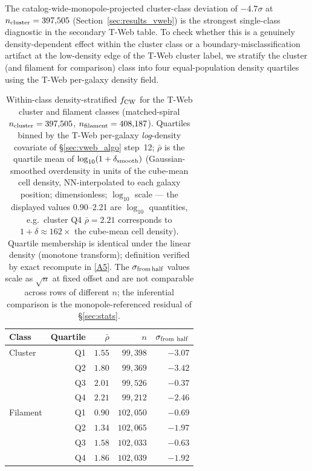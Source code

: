 \documentclass[twocolumn,linenumbers]{aastex702}
\newcommand{\repoBase}{https://github.com/Hubify-Projects/bigbounce/blob/main}
\begin{document}
The catalog-wide-monopole-projected cluster-class deviation of $-4.7\sigma$ at
$n_{\rm cluster} = 397{,}505$ (Section~\ref{sec:results_vweb}) is the
strongest single-class diagnostic in the secondary T-Web table. To check whether
this is a genuinely density-dependent effect within the cluster class
or a boundary-misclassification artifact at the low-density edge of
the T-Web cluster label, we stratify the cluster (and filament for
comparison) class into four equal-population density quartiles using
the T-Web per-galaxy density field.

\begin{table}[ht]
\caption{Within-class density-stratified $f_{\rm CW}$ for the T-Web
cluster and filament classes (matched-spiral $n_{\rm cluster} =
397{,}505$, $n_{\rm filament} = 408{,}187$). Quartiles binned by the
T-Web per-galaxy \emph{log}-density covariate of \S\ref{sec:vweb_algo}
step~12; $\bar\rho$ is the quartile mean of
$\log_{10}(1 + \delta_{\rm smooth})$ (Gaussian-smoothed overdensity
in units of the cube-mean cell density, NN-interpolated to each
galaxy position; dimensionless; $\log_{10}$ scale --- the displayed
values 0.90--2.21 are $\log_{10}$ quantities, e.g.\ cluster
Q4 $\bar\rho=2.21$ corresponds to $1\!+\!\delta\approx\!162\times$
the cube-mean cell density). Quartile membership is identical under
the linear density (monotone transform); definition verified by exact
recompute in
\href{\repoBase/pipelines/p5\_desi\_chirality/outputs/21\_r23conf\_meta\_closures.json}{[A5]}.
The $\sigma_{\rm from\,half}$ values scale as $\sqrt{n}$ at fixed
offset and are not comparable across rows of different $n$; the
inferential comparison is the monopole-referenced residual of
\S\ref{sec:stats}.}
\label{tab:within_class_density}
\begin{ruledtabular}
\begin{tabular}{lrrrr}
Class & Quartile & $\bar\rho$ & $n$ & $\sigma_{\rm from\ half}$ \\
\hline
Cluster  & Q1 & $1.55$ & $99{,}398$ & $-3.07$ \\
         & Q2 & $1.80$ & $99{,}369$ & $-3.42$ \\
         & Q3 & $2.01$ & $99{,}526$ & $-0.37$ \\
         & Q4 & $2.21$ & $99{,}212$ & $-2.46$ \\
Filament & Q1 & $0.90$ & $102{,}050$ & $-0.69$ \\
         & Q2 & $1.34$ & $102{,}065$ & $-1.97$ \\
         & Q3 & $1.58$ & $102{,}033$ & $-0.63$ \\
         & Q4 & $1.86$ & $102{,}039$ & $-1.92$ \\
\end{tabular}
\end{ruledtabular}
\end{table}
\end{document}
